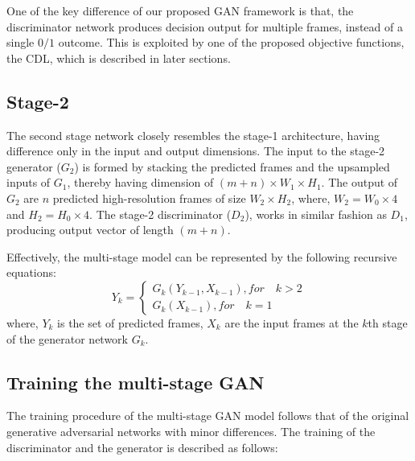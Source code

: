 \documentclass{article}
\begin{document}
	  One of the key difference of our proposed GAN framework is that, the discriminator network produces decision output for multiple frames, instead of a single $ 0/1 $ outcome. This is exploited by one of the proposed objective functions, the CDL, which is described in later sections.
  
  \subsection{Stage-2}
	  The second stage network closely resembles the stage-1 architecture, having difference only in the input and output dimensions. The input to the stage-2 generator ($ G_2 $) is formed by stacking the predicted frames and the upsampled inputs of $ G_1 $, thereby having dimension of $ (m + n) \times W_1 \times H_1 $.
	  The output of $ G_2 $ are $ n $ predicted high-resolution frames of size $ W_2 \times H_2 $, where, $ W_2 = W_0 \times 4 $ and $ H_2 = H_0 \times 4 $. The stage-2 discriminator ($ D_2 $), works in similar fashion as $ D_1 $, producing output vector of length $ (m + n) $.
	  
	  Effectively, the multi-stage model can be represented by the following recursive equations:
	  \begin{equation}
	  	Y_k = 
	  	\left\{
	  	\begin{array}{l}
	  	G_k(Y_{k-1}, X_{k-1}), for \quad k > 2\\
	  	G_k(X_{k-1}), for \quad k = 1
	  	\end{array}
	  	\right.
	  	\label{eq:multi-gan}
	  \end{equation}
	  where, $ Y_k $ is the set of predicted frames, $ X_k $ are the input frames at the $ k $th stage of the generator network $ G_k $.
  
\subsection{Training the multi-stage GAN}
  The training procedure of the multi-stage GAN model follows that of the original generative adversarial networks with minor differences. The training of the discriminator and the generator is described as follows:
\end{document}
